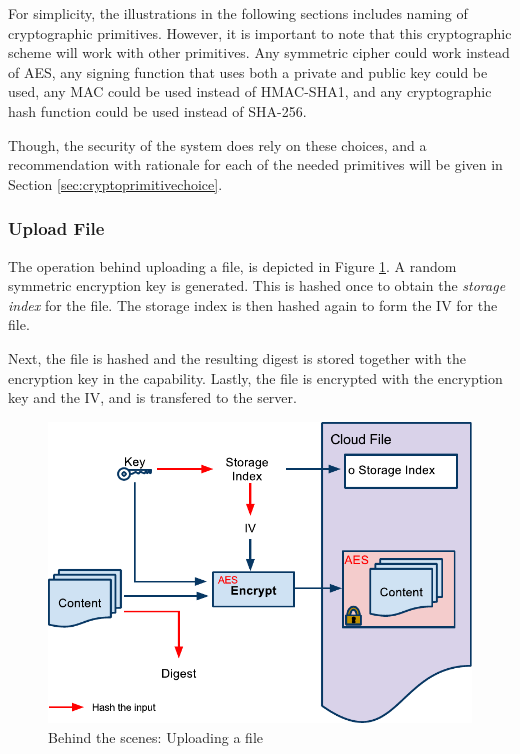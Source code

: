 \documentclass[pdftex,english,10pt,b5paper,twoside]{book}
\begin{document}
For simplicity, the illustrations in the following sections includes naming of
cryptographic primitives. However, it is important to note that this
cryptographic scheme will work with other primitives. Any symmetric cipher
could work instead of \ac{AES}, any signing function that uses both a private
and public key could be used, any \ac{MAC} could be used instead of
HMAC-\ac{SHA}1, and any cryptographic hash function could be used instead of
\ac{SHA}-256.

Though, the security of the system does rely on these choices, and a
recommendation with rationale for each of the needed primitives will be given
in Section \ref{sec:cryptoprimitivechoice}.

\subsubsection{Upload File}
\label{sec:CS:CF}

The operation behind uploading a file, is depicted in Figure \ref{fig:CS:CF}. A
random symmetric encryption key is generated. This is hashed once to obtain the
\emph{storage index} for the file. The storage index is then hashed again to
form the \ac{IV} for the file.

Next, the file is hashed and the resulting digest is stored together with the
encryption key in the capability. Lastly, the file is encrypted with the
encryption key and the \ac{IV}, and is transfered to the server.

\begin{figure}[h!]
    \centering
    \includegraphics[width=\columnwidth]{CryptoCreateFile.pdf}
    \caption{Behind the scenes: Uploading a file}
    \label{fig:CS:CF}
\end{figure}
\end{document}

